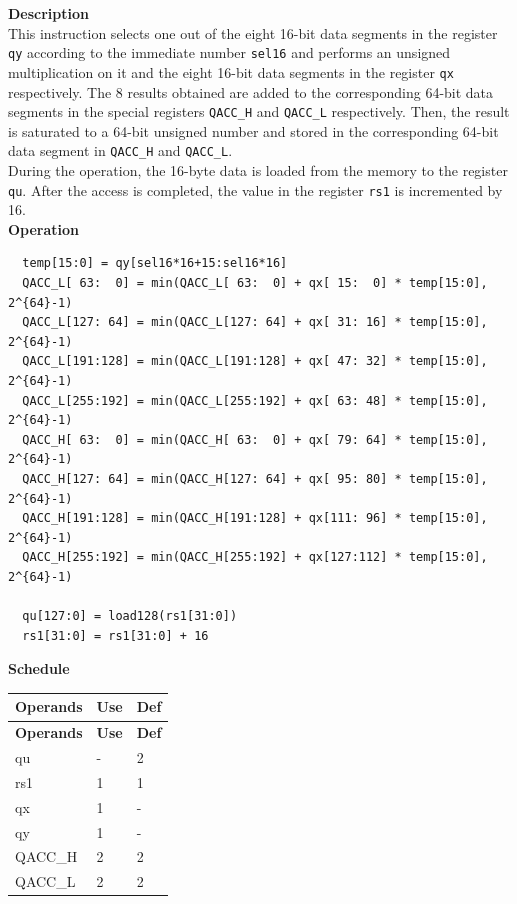 \textbf{Description}\\
This instruction selects one out of the eight 16-bit data segments in the register \lstinline{qy} according to the immediate number \lstinline{sel16} and performs an unsigned multiplication on it and the eight 16-bit data segments in the register \lstinline{qx} respectively. The 8 results obtained are added to the corresponding 64-bit data segments in the special registers \lstinline{QACC_H} and \lstinline{QACC_L} respectively. Then, the result is saturated to a 64-bit unsigned number and stored in the corresponding 64-bit data segment in \lstinline{QACC_H} and \lstinline{QACC_L}.\\
During the operation, the 16-byte data is loaded from the memory to the register \lstinline{qu}. After the access is completed, the value in the register \lstinline{rs1} is incremented by 16.\\
\textbf{Operation}
\begin{lstlisting}
  temp[15:0] = qy[sel16*16+15:sel16*16]
  QACC_L[ 63:  0] = min(QACC_L[ 63:  0] + qx[ 15:  0] * temp[15:0], 2^{64}-1)
  QACC_L[127: 64] = min(QACC_L[127: 64] + qx[ 31: 16] * temp[15:0], 2^{64}-1)
  QACC_L[191:128] = min(QACC_L[191:128] + qx[ 47: 32] * temp[15:0], 2^{64}-1)
  QACC_L[255:192] = min(QACC_L[255:192] + qx[ 63: 48] * temp[15:0], 2^{64}-1)
  QACC_H[ 63:  0] = min(QACC_H[ 63:  0] + qx[ 79: 64] * temp[15:0], 2^{64}-1)
  QACC_H[127: 64] = min(QACC_H[127: 64] + qx[ 95: 80] * temp[15:0], 2^{64}-1)
  QACC_H[191:128] = min(QACC_H[191:128] + qx[111: 96] * temp[15:0], 2^{64}-1)
  QACC_H[255:192] = min(QACC_H[255:192] + qx[127:112] * temp[15:0], 2^{64}-1)

  qu[127:0] = load128(rs1[31:0])
  rs1[31:0] = rs1[31:0] + 16
\end{lstlisting}

\textbf{Schedule}\\
\begin{longtable}[c]{|l|l|l|}
    \hline
    \rowcolor{lightgray}
    \textbf{Operands} & \textbf{Use} & \textbf{Def} \\\hline
    \endfirsthead
    \hline
    \rowcolor{lightgray}
     \textbf{Operands} & \textbf{Use} & \textbf{Def} \\\hline
    \endhead
    \hline
    \endfoot

    qu & - & 2 \\\hline
    rs1 & 1 & 1 \\\hline
     qx & 1 & - \\\hline
     qy & 1 & - \\\hline
     QACC\_H & 2 & 2 \\\hline
     QACC\_L & 2 & 2

\end{longtable}

